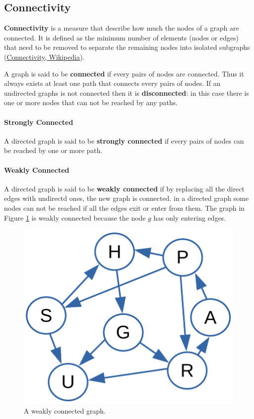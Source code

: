 \subsection{Connectivity}
\textbf{Connectivity} is a measure that describe how much the nodes of a graph are connected. It is defined as the minimum number of elements (nodes or edges) that need to be removed to separate the remaining nodes into isolated subgraphs \cite{wikiconnectivity} (\href{https://en.wikipedia.org/wiki/Connectivity_(graph_theory)}{Connectivity, Wikipedia}).

A graph is said to be \textbf{connected} if every pairs of nodes are connected. Thus it always exists at least one path that connects every pairs of nodes. If an undirected graphs is not connected then it is \textbf{disconnected}: in this case there is one or more nodes that can not be reached by any paths.

\paragraph{Strongly Connected}
A directed graph is said to be \textbf{strongly connected} if every pairs of nodes can be reached by one or more path.

\paragraph{Weakly Connected}
A directed graph is said to be \textbf{weakly connected} if by replacing all the direct edges with undirectd ones, the new graph is connected. in a directed graph some nodes can not be reached if all the edges exit or enter from them. The graph in Figure \ref{graphs_2} is weakly connected because the node \(g\) has only entering edges.

\begin{figure}[H]
	\begin{center}
		\includegraphics[scale=.6]{chapters/graphs/images/graphs_2.pdf}
		\caption[A weakly connected graph.]{A weakly connected graph.}
		\label{graphs_2}
	\end{center}
\end{figure}

